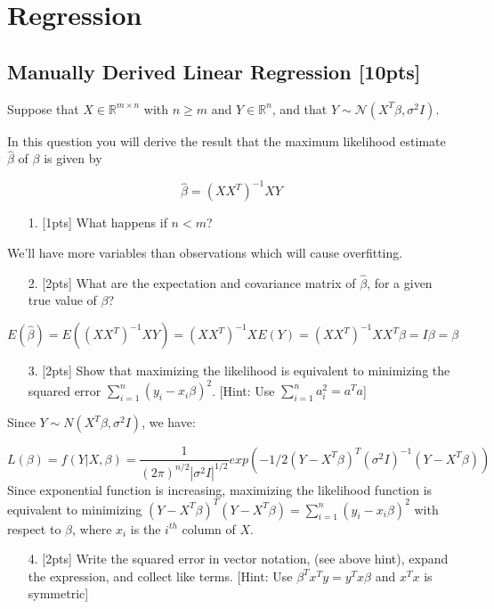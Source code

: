 \documentclass[12pt,a4paper]{article}
\begin{document}
\section{Regression}
\subsection{Manually Derived Linear Regression [10pts]}
Suppose that $X \in \mathbb{R}^{m \times n}$ with $n \geq m$ and $Y \in \mathbb{R}^n$, and that $Y \sim \mathcal{N}(X^T\beta, \sigma^2 I)$.

In this question you will derive the result that the maximum likelihood estimate $\hat\beta$ of $\beta$ is given by

\[
\hat\beta = (XX^T)^{-1}XY
\]
\begin{itemize}
\item[1. ] [1pts] What happens if $n < m$?

\end{itemize}
We'll have more variables than observations which will cause overfitting.

\begin{itemize}
\item[2. ] [2pts] What are the expectation and covariance matrix of $\hat\beta$, for a given true value of $\beta$?

\end{itemize}
\[
E(\hat{\beta}) = E((XX^{T})^{-1}XY) = (XX^{T})^{-1}XE(Y) = (XX^{T})^{-1}XX^{T}\beta
= I\beta = \beta
\]
\begin{itemize}
\item[3. ] [2pts] Show that maximizing the likelihood is equivalent to minimizing the squared error $\sum_{i=1}^n (y_i - x_i\beta)^2$. [Hint: Use $\sum_{i=1}^n a_i^2 = a^Ta$]

\end{itemize}
Since $Y\sim N(X^{T}\beta, \sigma^2I)$, we have:

\[
L(\beta) = f(Y|X,\beta) =
\frac{1}{(2\pi)^{n/2}|\sigma^2I|^{1/2}}exp(-1/2(Y-X^T\beta)^T(\sigma^2I)^{-1}(Y-X^T\beta))
\]
Since exponential function is increasing, maximizing the likelihood function is equivalent to minimizing $(Y-X^T\beta)^T(Y-X^T\beta)=\sum_{i=1}^n(y_i-x_i\beta)^2$ with respect to $\beta$, where $x_i$ is the $i^{th}$ column of $X$.

\begin{itemize}
\item[4. ] [2pts] Write the squared error in vector notation, (see above hint), expand the expression, and collect like terms. [Hint: Use $\beta^Tx^Ty = y^Tx\beta$ and $x^Tx$ is symmetric]

\end{itemize}
\end{document}
